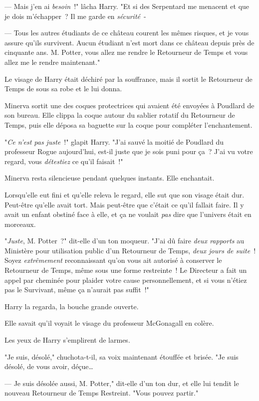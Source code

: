 --- Mais j'en ai \emph{besoin}~!" lâcha Harry. "Et si des Serpentard me menacent et que je dois m'échapper~? Il me garde en \emph{sécurité}~-

--- Tous les autres étudiants de ce château courent les mêmes risques, et je vous assure qu'ils survivent. Aucun étudiant n'est mort dans ce château depuis près de cinquante ans. M. Potter, vous allez me rendre le Retourneur de Temps et vous allez me le rendre maintenant."

Le visage de Harry était déchiré par la souffrance, mais il sortit le Retourneur de Temps de sous sa robe et le lui donna.

Minerva sortit une des coques protectrices qui avaient été envoyées à Poudlard de son bureau. Elle clippa la coque autour du sablier rotatif du Retourneur de Temps, puis elle déposa sa baguette sur la coque pour compléter l'enchantement.

"\emph{Ce n'est pas juste}~!" glapit Harry. "J'ai sauvé la moitié de Poudlard du professeur Rogue aujourd'hui, est-il juste que je sois puni pour ça~? J'ai vu votre regard, vous \emph{détestiez} ce qu'il faisait~!"

Minerva resta silencieuse pendant quelques instants. Elle enchantait.

Lorsqu'elle eut fini et qu'elle releva le regard, elle sut que son visage était dur. Peut-être qu'elle avait tort. Mais peut-être que c'était ce qu'il fallait faire. Il y avait un enfant obstiné face à elle, et ça ne voulait \emph{pas} dire que l'univers était en morceaux.

"\emph{Juste}, M. Potter~?" dit-elle d'un ton moqueur. "J'ai dû faire \emph{deux rapports} au Ministère pour utilisation public d'un Retourneur de Temps, \emph{deux jours de suite}~! Soyez \emph{extrêmement} reconnaissant qu'on vous ait autorisé à conserver le Retourneur de Temps, même sous une forme restreinte~! Le Directeur a fait un appel par cheminée pour plaider votre cause personnellement, et si vous n'étiez pas le Survivant, même ça n'aurait pas suffit~!"

Harry la regarda, la bouche grande ouverte.

Elle savait qu'il voyait le visage du professeur McGonagall en colère.

Les yeux de Harry s'emplirent de larmes.

"Je suis, désolé," chuchota-t-il, sa voix maintenant étouffée et brisée. "Je suis désolé, de vous avoir, déçue…

--- Je suis désolée aussi, M. Potter," dit-elle d'un ton dur, et elle lui tendit le nouveau Retourneur de Temps Restreint. "Vous pouvez partir."

